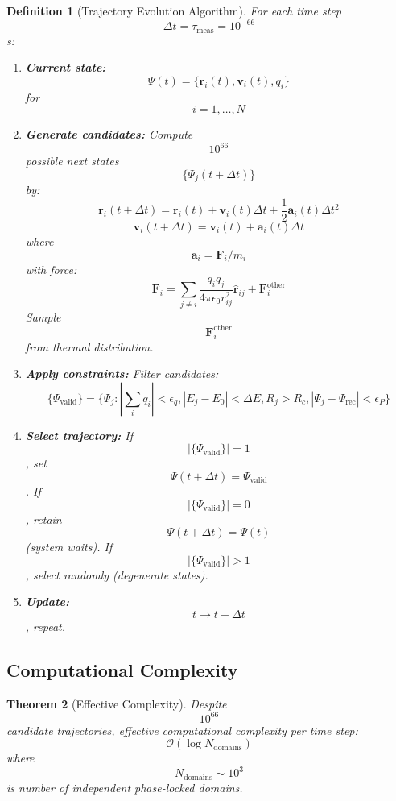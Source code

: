 \documentclass[11pt,twocolumn,a4paper]{article}
\newtheorem{theorem}{Theorem}[section]
\newtheorem{definition}[theorem]{Definition}
\theoremstyle{remark}
\begin{document}
\begin{definition}[Trajectory Evolution Algorithm]
\label{def:evolution_algorithm}
For each time step $$\Delta t = \tau_{\mathrm{meas}} = 10^{-66}$$ s:
\begin{enumerate}
\item \textbf{Current state:} $$\Psi(t) = \{\mathbf{r}_i(t), \mathbf{v}_i(t), q_i\}$$ for $$i = 1, \ldots, N$$
\item \textbf{Generate candidates:} Compute $$10^{66}$$ possible next states $$\{\Psi_j(t + \Delta t)\}$$ by:
$$
\mathbf{r}_i(t + \Delta t) = \mathbf{r}_i(t) + \mathbf{v}_i(t) \Delta t + \frac{1}{2}\mathbf{a}_i(t) \Delta t^2
$$
$$
\mathbf{v}_i(t + \Delta t) = \mathbf{v}_i(t) + \mathbf{a}_i(t) \Delta t
$$
where $$\mathbf{a}_i = \mathbf{F}_i/m_i$$ with force:
$$
\mathbf{F}_i = \sum_{j \neq i} \frac{q_i q_j}{4\pi\epsilon_0 r_{ij}^2} \hat{\mathbf{r}}_{ij} + \mathbf{F}_i^{\mathrm{other}}
$$
Sample $$\mathbf{F}_i^{\mathrm{other}}$$ from thermal distribution.

\item \textbf{Apply constraints:} Filter candidates:
$$
\{\Psi_{\mathrm{valid}}\} = \{\Psi_j : |\sum_i q_i| < \epsilon_q, |E_j - E_0| < \Delta E, R_j > R_c, |\Psi_j - \Psi_{\mathrm{rec}}| < \epsilon_P\}
$$

\item \textbf{Select trajectory:} If $$|\{\Psi_{\mathrm{valid}}\}| = 1$$, set $$\Psi(t + \Delta t) = \Psi_{\mathrm{valid}}$$. If $$|\{\Psi_{\mathrm{valid}}\}| = 0$$, retain $$\Psi(t + \Delta t) = \Psi(t)$$ (system waits). If $$|\{\Psi_{\mathrm{valid}}\}| > 1$$, select randomly (degenerate states).

\item \textbf{Update:} $$t \to t + \Delta t$$, repeat.
\end{enumerate}
\end{definition}

\subsection{Computational Complexity}

\begin{theorem}[Effective Complexity]
\label{thm:effective_complexity}
Despite $$10^{66}$$ candidate trajectories, effective computational complexity per time step:
$$
\mathcal{O}(\log N_{\mathrm{domains}})
$$
where $$N_{\mathrm{domains}} \sim 10^3$$ is number of independent phase-locked domains.
\end{theorem}
\end{document}
